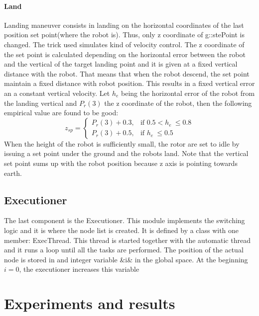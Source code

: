 \paragraph{Land} Landing maneuver consists in landing on the horizontal coordinates of the last position set point(where the robot is). Thus, only z coordinate of g::stePoint is changed. The trick used simulates  kind of velocity control. The z coordinate of the set point is calculated depending on the horizontal error between the robot and the vertical of the target landing point and it is given at a fixed vertical distance with the robot. That means that when the robot descend, the set point maintain a fixed distance with robot position. This results in a fixed vertical error an a constant vertical velocity. Let $h_e$ being the horizontal error of the robot from the landing vertical and $P_r(3)$ the z coordinate of the robot, then the following empirical value are found to be good:
\begin{equation}
z_{sp} = 
\begin{cases}
    P_r(3) + 0.3 , & \text{if } 0.5 <  h_e\ \leq 0.8 \\
    P_r(3) + 0.5  , & \text{if }  h_e\ \leq 0.5
\end{cases}
\label{eq:land}
\end{equation}
When the height of the robot is sufficiently small, the rotor are set to idle by issuing a set point under the ground and the robots land. Note that the vertical set point sums up with the robot position because z axis is pointing towards earth.
\subsection {Executioner}
\label{sec:exec}
The last component is the Executioner. This module implements the switching logic and it is where the node list is created. It is defined by a class with one member: ExecThread. This thread is started together with the automatic thread and it runs a loop until all the tasks are performed. The position of the actual node is stored in and integer variable &i& in the global space. At the beginning $i = 0$, the executioner increases this variable 

\section{Experiments and results}